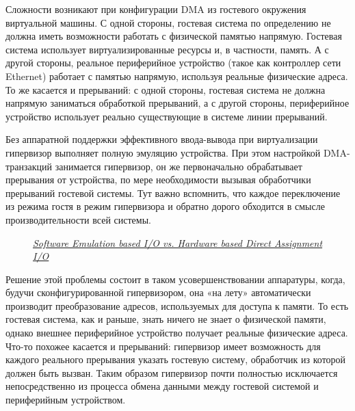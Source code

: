 \documentclass[14pt, a4paper]{article}
\begin{document}
Сложности возникают при конфигурации DMA из гостевого окружения виртуальной машины. С одной
стороны, гостевая система по определению не должна иметь возможности работать с физической
памятью напрямую. Гостевая система использует виртуализированные ресурсы и, в частности,
память. А с другой стороны, реальное периферийное устройство (такое как контроллер сети Ethernet)
работает с памятью напрямую, используя реальные физические адреса. То же касается и
прерываний: с одной стороны, гостевая система не должна напрямую заниматься обработкой
прерываний, а с другой стороны, периферийное устройство использует реально существующие в
системе линии прерываний.

Без аппаратной поддержки эффективного ввода-вывода при виртуализации гипервизор выполняет
полную эмуляцию устройства. При этом настройкой DMA-транзакций занимается гипервизор, он же
первоначально обрабатывает прерывания от устройства, по мере необходимости вызывая
обработчики прерываний гостевой системы. Тут важно вспомнить, что каждое переключение из
режима гостя в режим гипервизора и обратно дорого обходится в смысле производительности всей
системы.

\begin{figure}[h]%
    \centering
    \caption*{\href{https://software.intel.com/en-us/articles/intel-virtualization-technology-for-directed-io-vt-d-enhancing-intel-platforms-for-efficient-virtualization-of-io-devices}{\textit{Software Emulation based I/O vs. Hardware based Direct Assignment I/O}}}
    \label{framework} %
\end{figure}

Решение этой проблемы состоит в таком усовершенствовании аппаратуры, когда, будучи
сконфигурированной гипервизором, она «на лету» автоматически производит преобразование
адресов, используемых для доступа к памяти. То есть гостевая система, как и раньше, знать ничего не
знает о физической памяти, однако внешнее периферийное устройство получает реальные
физические адреса. Что-то похожее касается и прерываний: гипервизор имеет возможность для
каждого реального прерывания указать гостевую систему, обработчик из которой должен быть вызван.
Таким образом гипервизор почти полностью исключается непосредственно из процесса обмена
данными между гостевой системой и периферийным устройством.
\end{document}
